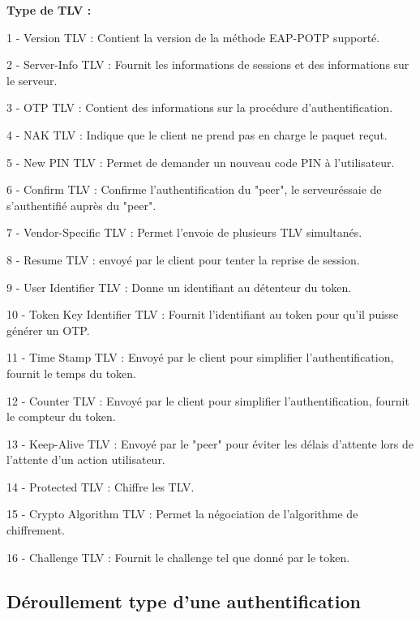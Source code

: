 \documentclass{article}
\begin{document}
\begin{description}
   \item \textbf{Type de TLV :}
\item   1 - Version TLV : Contient la version de la méthode EAP-POTP supporté.
\item   2 - Server-Info TLV : Fournit les informations de sessions et des informations sur le serveur.
\item   3 - OTP TLV : Contient des informations sur la procédure d'authentification.
\item   4 - NAK TLV : Indique que le client ne prend pas en charge le paquet reçut.
\item   5 - New PIN TLV : Permet de demander un nouveau code PIN à l'utilisateur.
\item   6 - Confirm TLV : Confirme l'authentification du "peer", le serveuréssaie de s'authentifié auprès du "peer".
\item   7 - Vendor-Specific TLV : Permet l'envoie de plusieurs TLV simultanés.
\item   8 - Resume TLV : envoyé par le client pour tenter la reprise de session.
\item   9 - User Identifier TLV : Donne un identifiant au détenteur du token.
\item 10 - Token Key Identifier TLV : Fournit l'identifiant au token pour qu'il puisse générer un OTP.
\item 11 - Time Stamp TLV : Envoyé par le client pour simplifier l'authentification, fournit le temps du token.
\item 12 - Counter TLV : Envoyé par le client pour simplifier l'authentification, fournit le compteur du token.
\item 13 - Keep-Alive TLV : Envoyé par le "peer" pour éviter les délais d'attente lors de l'attente d'un action utilisateur.
\item 14 - Protected TLV : Chiffre les TLV.
\item 15 - Crypto Algorithm TLV : Permet la négociation de l'algorithme de chiffrement.
\item 16 - Challenge TLV : Fournit le challenge tel que donné par le token.
\end{description}


\subsection{Déroullement type d'une authentification}
\end{document}
